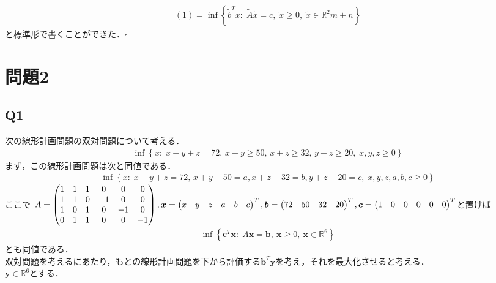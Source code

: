 \documentclass[a4j,uplatex]{jsarticle}
\theoremstyle{definition}
\begin{document}
\begin{align*}
    (1)=\inf \left\{ \tilde{b}^T\tilde{x}:\; \tilde{A}\tilde{x}=c,\; \tilde{x}\geq 0,\; \tilde{x}\in\mathbb{R}^2m+n\right\}
\end{align*}
と標準形で書くことができた．$\square$

\section{問題2}
\subsection{Q1}
次の線形計画問題の双対問題について考える．
\begin{align*}
    \inf \left\{ x:\; x+y+z=72,\, x+y\geq 50,\,x+z\geq 32,\,y+z\geq 20,\; x,y,z\geq 0 \right\}\tag{2}
\end{align*}
まず，この線形計画問題は次と同値である．
\begin{align*}
    \inf \left\{x:\; x+y+z=72,\,x+y-50=a,x+z-32=b,y+z-20=c,\; x,y,z,a,b,c\geq 0\right\}
\end{align*}
ここで
$A=
    \begin{pmatrix}
        1 & 1 & 1 & 0  & 0  & 0  \\
        1 & 1 & 0 & -1 & 0  & 0  \\
        1 & 0 & 1 & 0  & -1 & 0  \\
        0 & 1 & 1 & 0  & 0  & -1
    \end{pmatrix},\boldsymbol{x}=\begin{pmatrix}
        x & y & z & a & b & c
    \end{pmatrix}^T,
    \boldsymbol{b}=\begin{pmatrix}
        72 & 50 & 32 & 20
    \end{pmatrix}^T,\\
    \boldsymbol{c}=\begin{pmatrix}
        1 & 0 & 0 & 0 & 0 & 0
    \end{pmatrix}^T
$と置けば
\begin{align*}
    \inf \left\{\boldsymbol{c}^T\boldsymbol{x}:\; A\boldsymbol{x}=\boldsymbol{b},\: \boldsymbol{x}\geq 0,\: \boldsymbol{x}\in\mathbb{R}^6\right\}
\end{align*}
とも同値である．\\
双対問題を考えるにあたり，もとの線形計画問題を下から評価する$\boldsymbol{b}^T\boldsymbol{y}$を考え，それを最大化させると考える．\\
$\boldsymbol{y}\in \mathbb{R}^6$とする．
\end{document}
